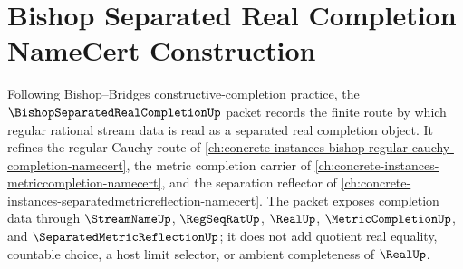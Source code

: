 \chapter{Bishop Separated Real Completion NameCert Construction}
\label{ch:concrete-instances-bishop-separated-real-completion-namecert}

Following Bishop--Bridges constructive-completion practice, the $\BishopSeparatedRealCompletionUp$ packet records the finite route by which regular rational stream data is read as a separated real completion object. It refines the regular Cauchy route of \autoref{ch:concrete-instances-bishop-regular-cauchy-completion-namecert}, the metric completion carrier of \autoref{ch:concrete-instances-metriccompletion-namecert}, and the separation reflector of \autoref{ch:concrete-instances-separatedmetricreflection-namecert}. The packet exposes completion data through $\StreamNameUp$, $\RegSeqRatUp$, $\RealUp$, $\MetricCompletionUp$, and $\SeparatedMetricReflectionUp$; it does not add quotient real equality, countable choice, a host limit selector, or ambient completeness of $\RealUp$.

